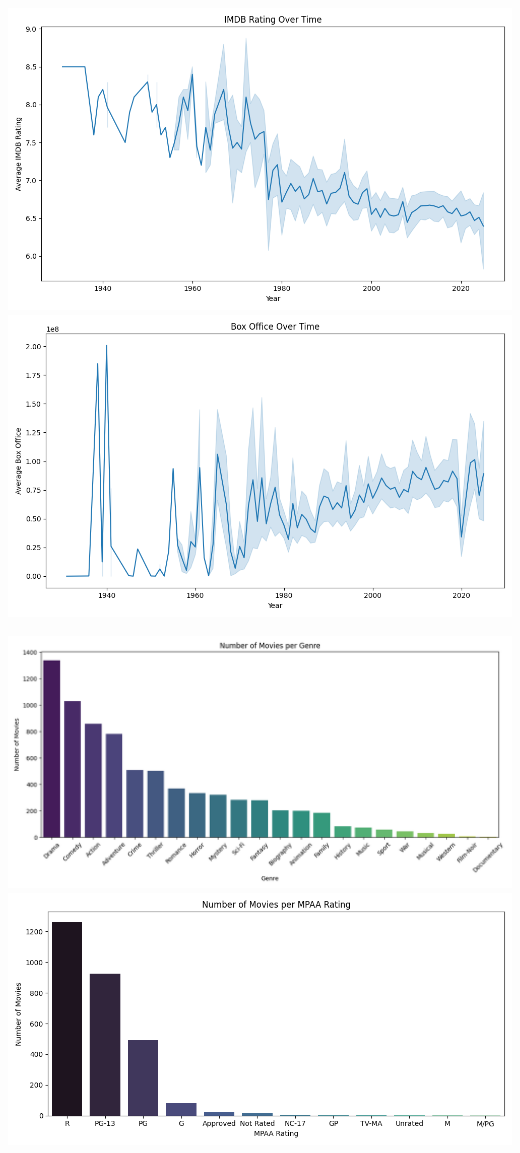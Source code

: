 \documentclass[
]{agujournal2019}
\begin{document}
\includegraphics{./notebooks/notebook_output/imdb_overtime.png}
\includegraphics{./notebooks/notebook_output/boxoffice_overtime.png}

\includegraphics{./notebooks/notebook_output/genre_counts.png}
\includegraphics{./notebooks/notebook_output/rated_counts.png}
\end{document}
